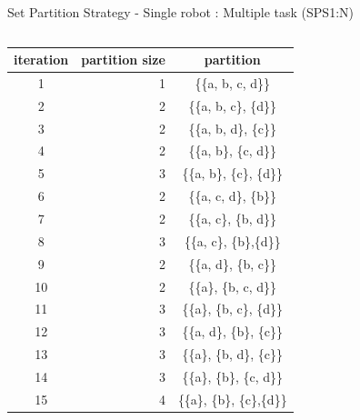     \begin{frame}[fragile]{Set Partition Strategy - Single robot : Multiple task (SPS1:N)}
         \begin{columns}
            \begin{column}{.7\textwidth}
                \begin{center}
                    \begin{tabular}{|c|r|c|} \hline
                    \textbf{iteration} & \textbf{partition size} & \textbf{partition} \\ \hline
                    1    & 1    & \{\{a, b, c, d\}\}   \\
                    2    & 2    & \{\{a, b, c\}, \{d\}\}   \\
                    3    & 2    & \{\{a, b, d\}, \{c\}\}   \\
                    4    & 2    & \{\{a, b\}, \{c, d\}\}   \\
                    5    & 3    & \{\{a, b\}, \{c\}, \{d\}\}   \\
                    6    & 2    & \{\{a, c, d\}, \{b\}\}   \\
                    7    & 2    & \{\{a, c\}, \{b, d\}\}   \\
                    8    & 3    & \{\{a, c\}, \{b\},\{d\}\}   \\
                    9    & 2    & \{\{a, d\}, \{b, c\}\}   \\
                    10   & 2    & \{\{a\}, \{b, c, d\}\}   \\
                    11   & 3    & \{\{a\}, \{b, c\}, \{d\}\}   \\
                    12   & 3    & \{\{a, d\}, \{b\}, \{c\}\}   \\
                    13   & 3    & \{\{a\}, \{b, d\}, \{c\}\}   \\
                    14   & 3    & \{\{a\}, \{b\}, \{c, d\}\}   \\
                    15   & 4    & \{\{a\}, \{b\}, \{c\},\{d\}\}   \\ \hline       
                    \end{tabular}
                  \end{center}
            \end{column}
            \begin{column}{.4\textwidth}
            \begin{figure}

\end{figure}
\end{column}
\end{columns}
\end{frame}
